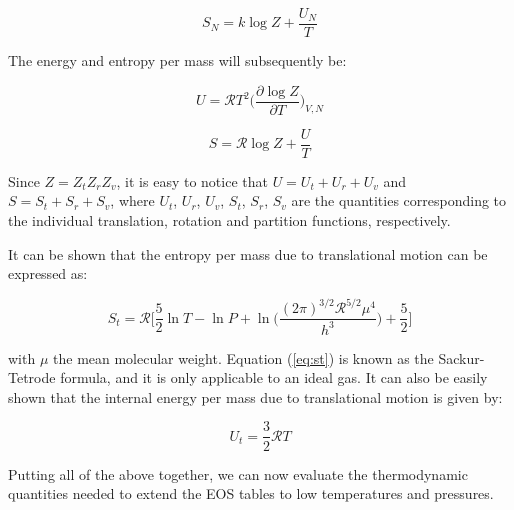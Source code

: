 \documentclass[apj]{emulateapj}
\begin{document}
\begin{equation}
\label{eq:S}
S_N=k \log{Z} + \frac{U_N}{T}
\end{equation}

The energy and entropy per mass will subsequently be:

\begin{equation}
\label{eq:u}
U=\mathcal{R} T^2 \Big(\frac{\partial \log{Z}}{\partial T}\Big)_{V, N}
\end{equation}

\begin{equation}
\label{eq:s}
S=\mathcal{R} \log{Z} + \frac{U}{T}
\end{equation}

Since $Z=Z_t Z_r Z_v$, it is easy to notice that $U=U_t+U_r+U_v$ and $S=S_t+S_r+S_v$, where $U_t$, $U_r$, $U_v$, $S_t$, $S_r$, $S_v$ are the quantities corresponding to the individual translation, rotation and partition functions, respectively.

It can be shown that the entropy per mass due to translational motion can be expressed as:

\begin{equation}
\label{eq:st}
S_t=\mathcal{R} \Big[ \frac{5}{2} \ln{T} - \ln{P} + \ln \Big( \frac{(2 \pi)^{3/2} \mathcal{R}^{5/2} \mu^4}{h^3}\Big) +\frac{5}{2} \Big]
\end{equation}

\noindent with $\mu$ the mean molecular weight. Equation (\ref{eq:st}) is known as the Sackur-Tetrode formula, and it is only applicable to an ideal gas. It can also be easily shown that the internal energy per mass due to translational motion is given by:

\begin{equation}
\label{eq:ut}
U_t=\frac{3}{2} \mathcal{R} T
\end{equation}

Putting all of the above together, we can now evaluate the thermodynamic quantities needed to extend the \cite{saumon95} EOS tables to low temperatures and pressures.
\end{document}
